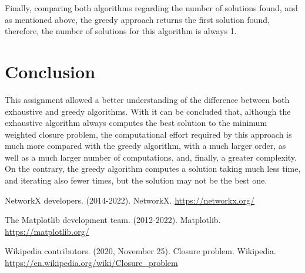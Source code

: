 \documentclass[...]{revdetua}
\begin{document}
Finally, comparing both algorithms regarding the number of solutions found, and as mentioned above, the greedy approach returns the first solution found, therefore, the number of solutions for this algorithm is always 1.

\section{Conclusion}

This assignment allowed a better understanding of the difference between both exhaustive and greedy algorithms. With it can be concluded that, although the exhaustive algorithm always computes the best solution to the minimum weighted closure problem, the computational effort required by this approach is much more compared with the greedy algorithm, with a much larger order, as well as a much larger number of computations, and, finally, a greater complexity. On the contrary, the greedy algorithm computes a solution taking much less time, and iterating also fewer times, but the solution may not be the best one.

\begin{thebibliography}{9}

NetworkX developers. (2014-2022). NetworkX. 
\url{https://networkx.org/}

The Matplotlib development team. (2012-2022). Matplotlib. \url{https://matplotlib.org/}

Wikipedia contributors. (2020, November 25). Closure problem. Wikipedia. \url{https://en.wikipedia.org/wiki/Closure_problem}

\end{thebibliography}




\end{document}
